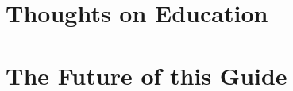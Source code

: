 
\newpage


\toclineskip
\section{Thoughts on Education}

\newpage


\toclineskip
\section{The Future of this Guide}

\newpage


